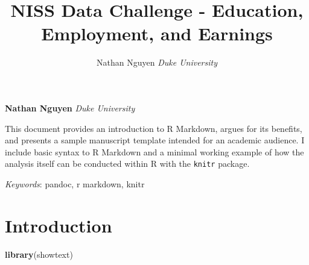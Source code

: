 \documentclass[11pt,]{article}
\title{NISS Data Challenge - Education, Employment, and Earnings  }
\author{\Large Nathan Nguyen\vspace{0.05in} \newline\normalsize\emph{Duke University}  }
\date{}
\newcommand*{\authorfont}{\fontfamily{phv}\selectfont}
\renewenvironment{abstract}
 {{%
    \setlength{\leftmargin}{0mm}
    \setlength{\rightmargin}{\leftmargin}%
  }%
  \relax}
 {\endlist}
\newenvironment{Shaded}{\begin{snugshade}}{\end{snugshade}}
\newcommand{\KeywordTok}[1]{\textcolor[rgb]{0.13,0.29,0.53}{\textbf{#1}}}
\newcommand{\NormalTok}[1]{#1}
\begin{document}
	
%

{%
\setlength{\parindent}{0pt}
\thispagestyle{plain}
{\fontsize{18}{20}\selectfont\raggedright 
\maketitle  %

}

{
   \vskip 13.5pt\relax \normalsize\fontsize{11}{12} 
\textbf{\authorfont Nathan Nguyen} \hskip 15pt \emph{\small Duke University}   

}

}








\begin{abstract}

    \hbox{\vrule height .2pt width 39.14pc}

    \vskip 8.5pt %

\noindent This document provides an introduction to R Markdown, argues for its
benefits, and presents a sample manuscript template intended for an
academic audience. I include basic syntax to R Markdown and a minimal
working example of how the analysis itself can be conducted within R
with the \texttt{knitr} package.


\vskip 8.5pt \noindent \emph{Keywords}: pandoc, r markdown, knitr \par

    \hbox{\vrule height .2pt width 39.14pc}



\end{abstract}


\vskip 6.5pt


\noindent  \hypertarget{introduction}{%
\section{Introduction}\label{introduction}}

\begin{Shaded}
\begin{Highlighting}[]
\KeywordTok{library}\NormalTok{(showtext)}
\end{Highlighting}
\end{Shaded}
\end{document}
